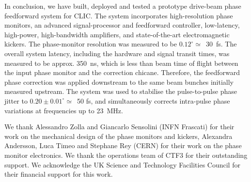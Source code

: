 \documentclass[%
 reprint,
 superscriptaddress,
 amsmath,
 amssymb,
 prl,
]{revtex4-1}
\begin{document}

In conclusion, we have built, deployed and tested a prototype drive-beam phase 
feedforward system for CLIC.   The system incorporates high-resolution phase 
monitors, an advanced signal-processor and feedforward controller, low-latency, 
high-power, high-bandwidth amplifiers, and state-of-the-art electromagnetic 
kickers. The phase-monitor resolution was measured to be 
\(0.12^\circ\simeq\)~30~fs.  The overall system latency, including the hardware 
and signal transit times, was measured to be approx. 350~ns, which is less than 
beam time of flight between the input phase monitor and the correction 
chicane.  Therefore, the feedforward phase correction was applied downstream to 
the same beam bunches initially measured upstream. The system was used to 
stabilise the pulse-to-pulse phase jitter to \(0.20\pm0.01^\circ\simeq\)~50 fs, 
and simultaneously corrects intra-pulse phase variations at frequencies up to 
23~MHz. 

\begin{acknowledgments}
	We thank Alessandro Zolla and Giancarlo Sensolini (INFN 
	Frascati) for their work on the mechanical design of the phase monitors and 
	kickers, 
	Alexandra Andersson, Luca Timeo and Stephane Rey (CERN) for their work on 
	the phase monitor electronics. We thank the operations team of 
	CTF3 for their outstanding support. We acknowledge the UK Science and 
	Technology Facilities Council for their financial 
	support for this work. 
\end{acknowledgments}


\end{document}

